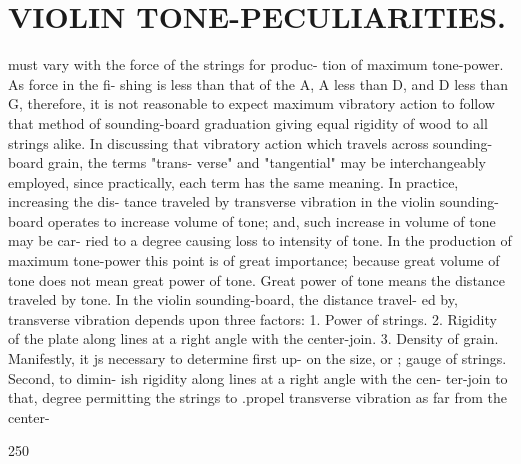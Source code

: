 \documentclass{article}
\begin{document}
\section*{VIOLIN TONE-PECULIARITIES.}
must vary with the force of the strings for produc- tion of maximum tone-power. As force in the fi- shing is less than that of the A, A less than D, and D less than G, therefore, it is not reasonable to expect maximum vibratory action to follow that method of sounding-board graduation giving equal rigidity of wood to all strings alike. In discussing that vibratory action which travels across sounding-board grain, the terms "trans- verse" and "tangential" may be interchangeably employed, since practically, each term has the same meaning. In practice, increasing the dis- tance traveled by transverse vibration in the violin sounding-board operates to increase volume of tone; and, such increase in volume of tone may be car- ried to a degree causing loss to intensity of tone. In the production of maximum tone-power this point is of great importance; because great volume of tone does not mean great power of tone. Great power of tone means the distance traveled by tone. In the violin sounding-board, the distance travel- ed by, transverse vibration depends upon three factors: 1. Power of strings. 2. Rigidity of the plate along lines at a right angle with the center-join. 3. Density of grain. Manifestly, it js necessary to determine first up- on the size, or ; gauge of strings. Second, to dimin- ish rigidity along lines at a right angle with the cen- ter-join to that, degree permitting the strings to .propel transverse vibration as far from the center-

250
\end{document}

